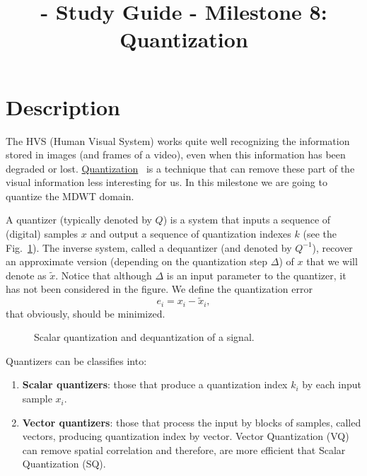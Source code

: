 
\title{\SM{} - Study Guide - Milestone 8: Quantization}

\maketitle

\section{Description}
The HVS (Human Visual System) works quite well recognizing the
information stored in images (and frames of a video), even when this
information has been degraded or
lost. \href{https://en.wikipedia.org/wiki/Quantization_(signal_processing)}{Quantization}~\cite{sayood2017introduction,vetterli2014foundations}
is a technique that can remove these part of the visual information
less interesting for us. In this milestone we are going to quantize
the MDWT domain.

A quantizer (typically denoted by $Q$) is a system that inputs a
sequence of (digital) samples $x$ and output a sequence of
quantization indexes $k$ (see the Fig.~\ref{fig:Q}). The inverse
system, called a dequantizer (and denoted by $Q^{-1}$), recover an
approximate version (depending on the quantization step $\Delta$) of
$x$ that we will denote as $\tilde{x}$. Notice that although $\Delta$
is an input parameter to the quantizer, it has not been considered in
the figure. We define the quantization error
\begin{equation}
  e_i = x_i - \tilde{x}_i,
\end{equation}
that obviously, should be minimized.

\begin{figure}
  \centering
  \caption{Scalar quantization and dequantization of a signal.}
  \label{fig:Q}
\end{figure}

Quantizers can be classifies into:
\begin{enumerate}
\item \textbf{Scalar quantizers}: those that produce a quantization
  index $k_i$ by each input sample $x_i$.
\item \textbf{Vector quantizers}: those that process the input by
  blocks of samples, called vectors, producing quantization index by
  vector. Vector Quantization (VQ) can remove spatial correlation and
  therefore, are more efficient that Scalar Quantization (SQ).
\end{enumerate}


